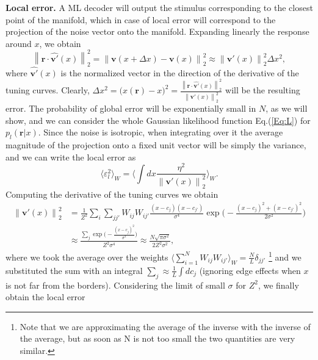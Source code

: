 \documentclass[a4paper]{article}
\begin{document}
\newline
\newline
\textbf{Local error.} A ML decoder will output the stimulus corresponding to the closest point of the manifold, which in case of local error will correspond to the projection of the noise vector onto the manifold. Expanding linearly the response around $x$, we obtain
\begin{equation}
\left\lVert \mathbf{r}\cdot \hat{\mathbf{v'}}(x)\right\rVert_2^2 =\left\lVert \mathbf{v}(x+\Delta x)-\mathbf{v}(x)\right\rVert_2^2 \approx \left\lVert\mathbf{v'}(x)\right\rVert_2^2\Delta x^2,
\end{equation}where $\hat{\mathbf{v'}}(x)$ is the normalized vector in the direction of the derivative of the tuning curves. Clearly, $\Delta x^2 = \big(\hat{x}(\mathbf{r})-x\big)^2 = \frac{\left\lVert \mathbf{r}\cdot \hat{\mathbf{v'}}(x)\right\rVert_2^2}{\left\lVert\mathbf{v'}(x)\right\rVert_2^2}$ will be the resulting error. The probability of global error will be exponentially small in $N$, as we will show, and we can consider the whole Gaussian likelihood function Eq.(\ref{Eq:L}) for $p_l(\mathbf{r}|x)$. Since the noise is isotropic, when integrating over it the average magnitude of the projection onto a fixed unit vector will be simply the variance, and we can write the local error as
\begin{equation}
\langle \varepsilon_l^2\rangle_W = \langle \int dx \frac{\eta^2}{\left \lVert \mathbf{v'}(x)\right\rVert_2^2}\rangle_W.
\end{equation}Computing the derivative of the tuning curves we obtain
\begin{equation}
\begin{split}
\left\lVert \mathbf{v'}(x)\right\rVert_2^2 &= \frac{1}{Z^2} \sum_i \sum_{jj'} W_{ij}W_{ij'}\frac{(x-c_j)(x-c_{j'})}{\sigma^4} \exp\Big(-\frac{(x-c_j)^2+(x-c_{j'})^2}{2\sigma^2}\Big)\\
& \approx\frac{\sum_j\exp\Big(-\frac{(x-c_j)^2}{\sigma^2}\Big) }{Z^2\sigma^4}\approx\frac{N \sqrt{\pi \sigma^2}}{2 Z^2\sigma^2},
\end{split}
\label{Eq:tcd}
\end{equation}where we took the average over the weights $\langle \sum_{i=1}^N W_{ij}W_{ij'}\rangle_W = \frac{N}{L} \delta_{jj'}$ \footnote{Note that we are approximating the average of the inverse with the inverse of the average, but as soon as N is not too small the two quantities are very similar.}
and we substituted the sum with an integral $\sum_j \approx \frac{1}{L}\int dc_j$ (ignoring edge effects when $x$ is not far from the borders). Considering the limit of small $\sigma$ for $Z^2$, we finally obtain the local error
\end{document}
